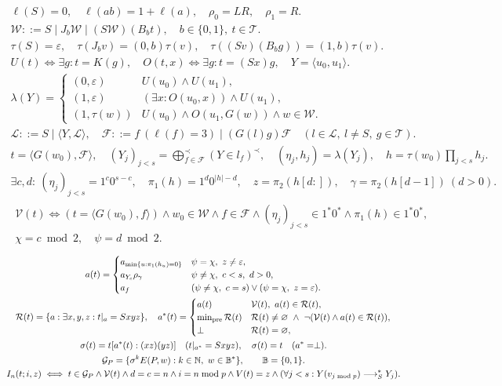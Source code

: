 \documentclass[10pt,letterpaper]{article}
\newcommand{\T}{\mathcal T}
\newcommand{\N}{\mathbb N}
\newcommand{\eps}{\varepsilon}
\newcommand{\bit}{\{0,1\}}
\newcommand{\pair}[2]{\langle #1,#2\rangle}
\newcommand{\R}{\longrightarrow_{S}}
\newcommand{\botv}{\perp}
\begin{document}
\begin{gather}
\ell(S)=0,\quad \ell(ab)=1+\ell(a),\quad
\rho_0=LR,\quad \rho_1=R .\\
\label{wordgrammar}\mathcal W::=S\mid J_b\mathcal W\mid(S\mathcal W)(B_b t),\quad b\in\bit,\ t\in\T .\\
\tau(S)=\eps,\quad \tau(J_bv)= (0,b)\tau(v),\quad
\tau((Sv)(B_bg))=(1,b)\tau(v).\\
U(t)\iff\exists g:t=K(g),\quad O(t,x)\iff\exists g:t=(Sx)g, \quad
Y=\pair{u_0}{u_1}.\\
\lambda(Y)=
\begin{cases}
(0,\eps)& U(u_0)\land U(u_1),\\
(1,\eps)&(\exists x:O(u_0,x))\land U(u_1),\\
(1,\tau(w))&U(u_0)\land O(u_1,G(w))\land w\in\mathcal W .
\end{cases}\\
\mathcal L ::= S\mid\pair{Y}{\mathcal L},\quad
\mathcal F ::= f\ (\ell(f)=3)\mid (G(l)g)\mathcal F\quad
(l\in\mathcal L,\ l\ne S,\ g\in\T).\\
t=\pair{G(w_0)}{\mathcal F},\quad
(Y_j)_{j<s}=\bigoplus_{f\in\mathcal F}^{\prec}(Y\in l_f)^\prec,\quad
(\eta_j,h_j)=\lambda(Y_j),\quad h=\tau(w_0)\prod_{j<s}h_j .\\
\label{lastgrammar}\exists c,d:\ (\eta_j)_{j<s}=1^c0^{s-c},\quad
\pi_1(h)=1^d0^{|h|-d},\quad
z=\pi_2(h[d:]),\quad \gamma=\pi_2(h[d-1])\ (d>0).\\
\begin{gathered}
\mathcal V(t)\iff (t=\pair{G(w_0)}{f})\land w_0\in\mathcal W\land f\in\mathcal F\land (\eta_j)_{j<s}\in1^*0^*\land\pi_1(h)\in1^*0^*,\\
\chi=c\bmod2,\quad\psi=d\bmod2 .
\end{gathered}
\end{gather}
\begin{gather}
a(t)=
\begin{cases}
a_{\min\{u:\pi_1(h_u)=0\}}&\psi=\chi,\ z\ne\eps,\\
a_{Y_c}\rho_\gamma&\psi\ne\chi,\ c<s,\ d>0,\\
a_f&(\psi\ne\chi,\ c=s)\lor(\psi=\chi,\ z=\eps).
\end{cases}\\
\mathcal R(t)=\{a:\exists x,y,z:t|_a=Sxyz\},\quad
a^*(t)=\begin{cases}a(t)&\mathcal V(t),\ a(t)\in\mathcal R(t),\\
\min_{\mathrm{pre}}\mathcal R(t)&\mathcal R(t)\ne\varnothing \ \land\
 \neg(\mathcal V(t)\land a(t)\in\mathcal R(t)),\\
\botv&\mathcal R(t)=\varnothing ,
\end{cases}\\
\sigma(t)=t[a^*(t):(xz)(yz)]\quad(t|_{a^*}=Sxyz),\quad
\sigma(t)=t\quad(a^*=\botv).\\
\mathcal G_P=\{\sigma^k E(P,w): k\in\N,\ w\in\mathbb B^*\},\qquad \mathbb B=\{0,1\}.\\
I_n(t;i,z)\iff t\in\mathcal G_P\land\mathcal V(t)\land d=c=n\land i=n\bmod p\land V(t)=z
 \land(\forall j<s:Y(v_{j\bmod p})\R^*Y_j). \notag
\end{gather}
\end{document}
